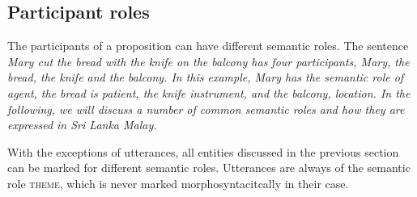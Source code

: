 %
%

\subsection{Participant roles}\label{sec:func:Participantroles}
The participants of a proposition can have different semantic roles. The sentence \em Mary cut the bread with the knife on the balcony \em has four participants, \em Mary, the bread, the knife \em and \em the balcony\em. In this example, Mary has the semantic role of agent, the bread is patient, the knife instrument, and the balcony, location. In the following, we will discuss a number of common semantic roles and how they are expressed in Sri Lanka Malay.

With the exceptions of utterances, all entities discussed in the previous section can be marked for different semantic roles. Utterances are always of the semantic role \textsc{theme}, which is never marked morphosyntacitcally in their case.

